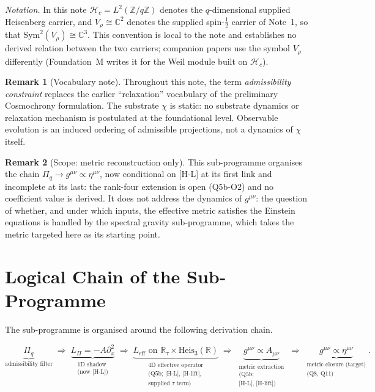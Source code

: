 \documentclass[11pt,a4paper]{article}
\theoremstyle{definition}
\newtheorem{remark}{Remark}
\newcommand{\Heis}{\mathrm{Heis}}
\newcommand{\Leff}{L_{\mathrm{eff}}}
\newcommand{\Lpi}{L_\Pi}
\newcommand{\geff}{g^{\mu\nu}}
\newcommand{\Sym}{\mathrm{Sym}}
\begin{document}
    \medskip
    \noindent\textit{Notation.}
    In this note $\mathcal{H}_c = L^2(\mathbb{Z}/q\mathbb{Z})$ denotes the $q$-dimensional supplied
    Heisenberg carrier, and $V_\rho \cong \mathbb{C}^2$ denotes the supplied spin-$\tfrac{1}{2}$
    carrier of Note~1, so that $\Sym^2(V_\rho) \cong \mathbb{C}^3$.
    This convention is local to the note and establishes no derived relation between the two
    carriers; companion papers use the symbol $V_\rho$ differently (Foundation~M writes it for the
    Weil module built on $\mathcal{H}_c$).

    \begin{remark}[Vocabulary note]
Throughout this note, the term \emph{admissibility constraint} replaces the earlier
``relaxation'' vocabulary of the preliminary Cosmochrony formulation.
The substrate $\chi$ is static: no substrate dynamics or relaxation mechanism is
postulated at the foundational level.
Observable evolution is an induced ordering of admissible projections, not a dynamics of
$\chi$ itself.
    \end{remark}

    \begin{remark}[Scope: metric reconstruction only]
This sub-programme organises the chain $\Pi_q \to \geff \propto \eta^{\mu\nu}$, now
conditional on [H-L] at its first link and incomplete at its last: the rank-four extension is
open (Q5b-O2) and no coefficient value is derived.
It does not address the dynamics of $\geff$: the question of whether, and under which inputs, the effective
metric satisfies the Einstein equations is handled by the spectral gravity sub-programme, which
takes the metric targeted here as its starting point.
    \end{remark}

  \section{Logical Chain of the Sub-Programme}
    \label{sec:chain}

    The sub-programme is organised around the following derivation chain.

    \begin{equation}
      \label{eq:chain}
      \underbrace{\Pi_q}_{\text{admissibility filter}}
      \;\Longrightarrow\;
      \underbrace{\Lpi = -A\partial_x^2}_{\substack{\text{1D shadow} \\ \text{(now [H-L])}}}
      \;\Longrightarrow\;
      \underbrace{\Leff \text{ on } \mathbb{R}_\tau \times \Heis_3(\mathbb{R})}_{\substack{\text{4D effective operator} \\ \text{(Q5b; [H-L], [H-lift],} \\ \text{supplied $\tau$ term)}}}
      \;\Longrightarrow\;
      \underbrace{\geff \propto A_{\mu\nu}}_{\substack{\text{metric extraction} \\ \text{(Q5b;} \\ \text{[H-L], [H-lift])}}}
      \;\Longrightarrow\;
      \underbrace{\geff \propto \eta^{\mu\nu}}_{\substack{\text{metric closure (target)} \\ \text{(Q8, Q11)}}}.
    \end{equation}
\end{document}
